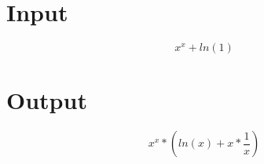\documentclass[a4paper, 12pt]{article}
\begin{document}
\Large
\section{Input}

\[x ^ x + ln(1 ) \]
\section{Output}

\[x ^ x * (ln(x ) + x * \frac{1 }{x })\]
\end{document}
